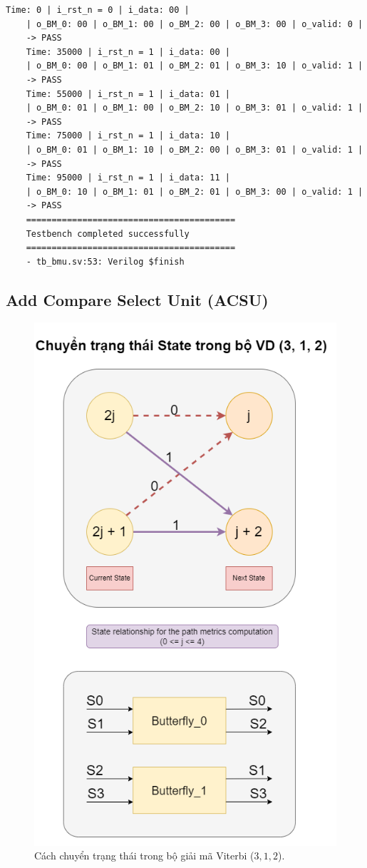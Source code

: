 \begin{lstlisting}[style=StyleResult, language=Result]
	Time: 0 | i_rst_n = 0 | i_data: 00 |
	| o_BM_0: 00 | o_BM_1: 00 | o_BM_2: 00 | o_BM_3: 00 | o_valid: 0 |
	-> PASS
	Time: 35000 | i_rst_n = 1 | i_data: 00 |
	| o_BM_0: 00 | o_BM_1: 01 | o_BM_2: 01 | o_BM_3: 10 | o_valid: 1 |
	-> PASS
	Time: 55000 | i_rst_n = 1 | i_data: 01 |
	| o_BM_0: 01 | o_BM_1: 00 | o_BM_2: 10 | o_BM_3: 01 | o_valid: 1 |
	-> PASS
	Time: 75000 | i_rst_n = 1 | i_data: 10 |
	| o_BM_0: 01 | o_BM_1: 10 | o_BM_2: 00 | o_BM_3: 01 | o_valid: 1 |
	-> PASS
	Time: 95000 | i_rst_n = 1 | i_data: 11 |
	| o_BM_0: 10 | o_BM_1: 01 | o_BM_2: 01 | o_BM_3: 00 | o_valid: 1 |
	-> PASS
	=========================================
	Testbench completed successfully
	=========================================
	- tb_bmu.sv:53: Verilog $finish
\end{lstlisting}

\subsection{Add Compare Select Unit (ACSU)}

\begin{figure}[H]
	\centering
	\includegraphics[width=.6\linewidth]{sections/pic/mophongbangSystemVerilog/ACSU_proc_state.png}
	\caption{Cách chuyển trạng thái trong bộ giải mã Viterbi ($3, 1, 2$).}
\end{figure}

